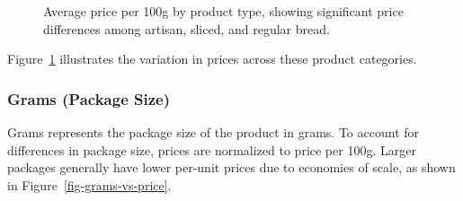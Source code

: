 \documentclass[
  letterpaper,
  DIV=11,
  numbers=noendperiod]{scrartcl}
\begin{document}
\begin{figure}


\caption{\label{fig-product-type-prices}Average price per 100g by
product type, showing significant price differences among artisan,
sliced, and regular bread.}

\end{figure}%

Figure~\ref{fig-product-type-prices} illustrates the variation in prices
across these product categories.

\subsubsection{Grams (Package Size)}\label{grams-package-size}

Grams represents the package size of the product in grams. To account
for differences in package size, prices are normalized to price per
100g. Larger packages generally have lower per-unit prices due to
economies of scale, as shown in Figure~\ref{fig-grams-vs-price}.
\end{document}
